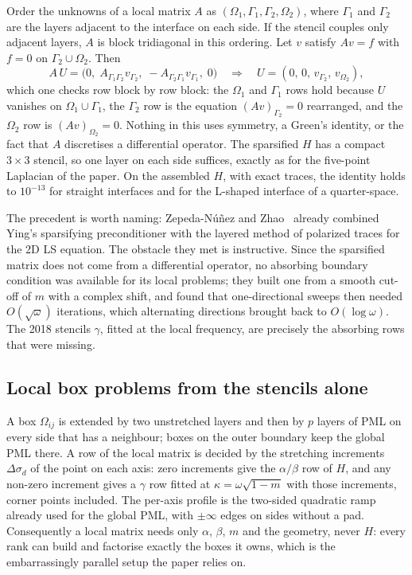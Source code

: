 \documentclass[11pt]{article}
\newcommand{\Om}{\Omega}
\newcommand{\Gam}{\Gamma}
\begin{document}
Order the unknowns of a local matrix $A$ as $(\Om_1,\Gam_1,\Gam_2,\Om_2)$, where $\Gam_1$
and $\Gam_2$ are the layers adjacent to the interface on each side. If the stencil
couples only adjacent layers, $A$ is block tridiagonal in this ordering. Let $v$ satisfy
$Av=f$ with $f=0$ on $\Gam_2\cup\Om_2$. Then
\begin{equation}
  A\,U = \bigl(0,\;A_{\Gam_1\Gam_2}v_{\Gam_2},\;-A_{\Gam_2\Gam_1}v_{\Gam_1},\;0\bigr)
  \quad\Longrightarrow\quad U=(0,\,0,\,v_{\Gam_2},\,v_{\Om_2}),
  \label{eq:pol}
\end{equation}
which one checks row block by row block: the $\Om_1$ and $\Gam_1$ rows hold because $U$
vanishes on $\Om_1\cup\Gam_1$, the $\Gam_2$ row is the equation $(Av)_{\Gam_2}=0$
rearranged, and the $\Om_2$ row is $(Av)_{\Om_2}=0$. Nothing in this uses symmetry, a
Green's identity, or the fact that $A$ discretises a differential operator. The sparsified
$H$ has a compact $3\times3$ stencil, so one layer on each side suffices, exactly as for the
five-point Laplacian of the paper. On the assembled $H$, with exact traces, the identity
holds to $10^{-13}$ for straight interfaces and for the L-shaped interface of a
quarter-space.

The precedent is worth naming: Zepeda-N\'u\~nez and Zhao~\cite{ZepedaZhao2016} already
combined Ying's sparsifying preconditioner with the layered method of polarized traces for
the 2D LS equation. The obstacle they met is instructive. Since the sparsified matrix does
not come from a differential operator, no absorbing boundary condition was available for
its local problems; they built one from a smooth cut-off of $m$ with a complex shift, and
found that one-directional sweeps then needed $O(\sqrt\omega)$ iterations, which alternating
directions brought back to $O(\log\omega)$. The 2018 stencils $\gamma$, fitted at the local
frequency, are precisely the absorbing rows that were missing.

\subsection{Local box problems from the stencils alone}

A box $\Om_{ij}$ is extended by two unstretched layers and then by $p$ layers of PML on
every side that has a neighbour; boxes on the outer boundary keep the global PML there. A
row of the local matrix is decided by the stretching increments $\Delta\sigma_d$ of the
point on each axis: zero increments give the $\alpha/\beta$ row of $H$, and any non-zero
increment gives a $\gamma$ row fitted at $\kappa=\omega\sqrt{1-m}$ with those increments,
corner points included. The per-axis profile is the two-sided quadratic ramp already used
for the global PML, with $\pm\infty$ edges on sides without a pad. Consequently a local
matrix needs only $\alpha$, $\beta$, $m$ and the geometry, never $H$: every rank can build
and factorise exactly the boxes it owns, which is the embarrassingly parallel setup the
paper relies on.
\end{document}
